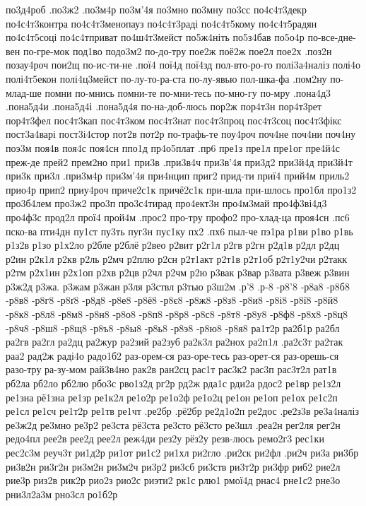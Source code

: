 {{по3д4роб
.по3ж2
.по3м4р
по3м'4я
по3мно
по3мну
по3сс
по4с4т3декр
по4с4т3контра
по4с4т3менопауз
по4с4т3раді
по4с4т5кому
по4с4т5радян
по4с4т5соці
по4с4тприват
по4ш4т3мейст
по5ж4ніть
по5з4бав
по5о4р
по-все-дне-вен
по-гре-мок
под1во
подо3м2
по-до-тру
пое2ж
поё2ж
пое2л
пое2х
.поз2н
позау4роч
пои2щ
по-ис-ти-не
.пої4
пої4д
пої4зд
пол-вто-ро-го
полі3а4наліз
полі4о
полі4т5екон
полі4ц3мейст
по-лу-то-ра-ста
по-лу-явью
пол-шка-фа
.пом2ну
по-млад-ше
помни
по-мнись
помни-те
по-мни-тесь
по-мно-гу
по-мру
.пона4д3
.пона5д4и
.пона5д4і
.пона5д4я
по-на-доб-люсь
пор2ж
пор4т3н
пор4т3рет
пор4т3фел
пос4т3кап
пос4т3ком
пос4т3нат
пос4т3проц
пос4т3соц
пос4т3фікс
пост3а4варі
пост3і4стор
пот2в
пот2р
по-трафь-те
поу4роч
поч4не
поч4ни
поч4ну
поэ3м
поя4в
поя4с
поя4сн
ппо1д
пр4о5плат
.пр6
пре1з
пре1л
пре1ог
пре4й4с
преж-де
прей2
прем2но
при1
при3в
.при3в4ч
при3в'4я
при3д2
при3й4д
при3й4т
при3к
при3л
.при3м4р
при3м'4я
при4нцип
приг2
прид-ти
приї4
прий4м
приль2
прио4р
прип2
приу4роч
приче2с1к
причё2с1к
при-шла
при-шлось
про1бл
про1з2
про3б4лем
про3ж2
про3п
про3с4тирад
про4ект3н
про4м3май
про4ф3ві4д3
про4ф3с
прод2л
прої4
прой4м
.прос2
про-тру
профо2
про-хлад-ца
проя4сн
.пс6
пско-ва
пти4дн
пу1ст
пу3ть
пуг3н
пус1ку
пх2
.пх6
пыл-че
пэ1ра
р1ви
р1во
р1вь
р1з2в
р1зо
р1х2ло
р2бле
р2блё
р2вео
р2вит
р2г1л
р2гв
р2гн
р2д1в
р2дл
р2дц
р2ин
р2к1л
р2кв
р2ль
р2мч
р2плю
р2сн
р2т1акт
р2т1в
р2т1об
р2т1у2чи
р2такк
р2тм
р2х1ин
р2х1оп
р2хв
р2цв
р2чл
р2чм
р2ю
р3вак
р3вар
р3вата
р3веж
р3вин
р3ж2д
р3жа.
р3жам
р3жан
р3ля
р3ствл
р3тью
р3ш2м
.р'8
.р-8
-р8'8
-р8а8
-р8б8
-р8в8
-р8г8
-р8ґ8
-р8д8
-р8е8
-р8ё8
-р8є8
-р8ж8
-р8з8
-р8и8
-р8і8
-р8ї8
-р8й8
-р8к8
-р8л8
-р8м8
-р8н8
-р8о8
-р8п8
-р8р8
-р8с8
-р8т8
-р8у8
-р8ф8
-р8х8
-р8ц8
-р8ч8
-р8ш8
-р8щ8
-р8ъ8
-р8ы8
-р8ь8
-р8э8
-р8ю8
-р8я8
ра1т2р
ра2б1р
ра2бл
ра2гв
ра2гл
ра2дц
ра2жур
ра2зий
ра2зуб
ра2к3л
ра2нох
ра2п1л
.ра2с3т
ра2так
раа2
рад2ж
раді4о
радо1б2
раз-орем-ся
раз-оре-тесь
раз-орет-ся
раз-орешь-ся
разо-тру
ра-зу-мом
рай3в4но
рак2в
ран2сц
рас1т
рас3к2
рас3п
рас3т2л
рат1в
рб2ла
рб2ло
рб2лю
рбо3с
рво1з2д
рг2р
рд2ж
рда1с
рди2а
рдос2
ре1вр
ре1з2л
ре1зна
рё1зна
ре1зр
ре1к2л
ре1о2р
ре1о2ф
ре1о2ц
ре1он
ре1оп
ре1ох
ре1с2п
ре1сл
ре1сч
ре1т2р
ре1тв
ре1чт
.ре2бр
.рё2бр
ре2д1о2п
ре2дос
.ре2з3в
ре3а4наліз
ре3ж2д
ре3мно
ре3р2
ре3ста
рё3ста
ре3сто
рё3сто
ре3шл
.реа2н
рег2ля
рег2н
редо4пл
рее2в
рее2д
рее2л
реж4ди
рез2у
рёз2у
резв-люсь
ремо2г3
рес1ки
рес2с3м
реуч3т
ри1д2р
ри1от
ри1с2
ри1хл
ри2гло
.ри2ск
ри2фл
.ри2ч
ри3а
ри3бр
ри3в2н
ри3г2н
ри3м2н
ри3м2ч
ри3р2
ри3сб
ри3ств
ри3т2р
ри3фр
риб2
рие2л
рие3р
риз2в
рик2р
рио2з
рио2с
риэти2
рк1с
рлю1
рмої4д
рнас4
рне1с2
рне3о
рни3л2а3м
рно3сл
ро1б2р
}}
